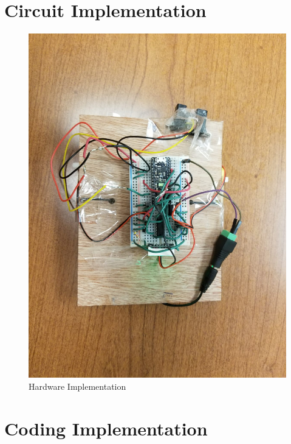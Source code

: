 \documentclass[12pt]{article}
\begin{document}
\section{Circuit Implementation}
\newpage
\begin{figure}[h!]
\centering
\label{HardReq}
\includegraphics[scale=0.2]{image.jpeg}
\caption{Hardware Implementation}
\end{figure}


\section{Coding Implementation}
\end{document}
